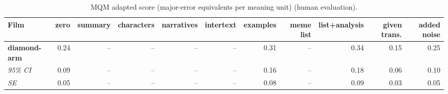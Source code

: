\begin{table}[ht]
\centering
\begin{adjustbox}{width=\textwidth}
\begin{tabular}{lrrrrrrrrr|r}
Film & zero & summary & characters & narratives & intertext & examples & meme list & list+analysis & given trans. & added noise \\
\hline
\textbf{diamond-arm} & 0.24 & -- & -- & -- & -- & 0.31 & -- & 0.34 & 0.15 & 0.25 \\

\emph{95\% CI} & 0.09 & -- & -- & -- & -- & 0.16 & -- & 0.18 & 0.06 & 0.10 \\

\emph{SE} & 0.05 & -- & -- & -- & -- & 0.08 & -- & 0.09 & 0.03 & 0.05 \\

\hline
\end{tabular}
\end{adjustbox}
\caption{MQM adapted score (major-error equivalents per meaning unit) (human evaluation).}
\label{tab:mqm-method-comparison-human}
\end{table}
